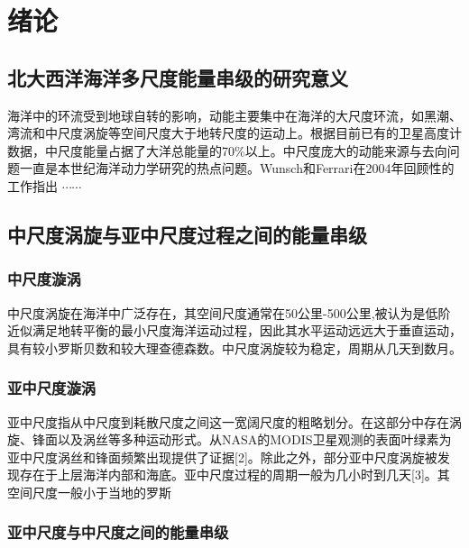 \chapter{绪论}


\section{北大西洋海洋多尺度能量串级的研究意义}

海洋中的环流受到地球自转的影响，动能主要集中在海洋的大尺度环流，如黑潮、湾流和中尺度涡旋等空间尺度大于地转尺度的运动上。根据目前已有的卫星高度计数据，中尺度能量占据了大洋总能量的70\%以上。中尺度庞大的动能来源与去向问题一直是本世纪海洋动力学研究的热点问题。Wunsch和Ferrari在2004年回顾性的工作指出 $\cdots\cdots$ 


\section{中尺度涡旋与亚中尺度过程之间的能量串级}

\subsection{中尺度漩涡}

中尺度涡旋在海洋中广泛存在，其空间尺度通常在50公里-500公里,被认为是低阶近似满足地转平衡的最小尺度海洋运动过程，因此其水平运动远远大于垂直运动，具有较小罗斯贝数和较大理查德森数。中尺度涡旋较为稳定，周期从几天到数月。

\subsection{亚中尺度漩涡}

亚中尺度指从中尺度到耗散尺度之间这一宽阔尺度的粗略划分。在这部分中存在涡旋、锋面以及涡丝等多种运动形式。从NASA的MODIS卫星观测的表面叶绿素为亚中尺度涡丝和锋面频繁出现提供了证据[2]。除此之外，部分亚中尺度涡旋被发现存在于上层海洋内部和海底。亚中尺度过程的周期一般为几小时到几天[3]。其空间尺度一般小于当地的罗斯

\subsection{亚中尺度与中尺度之间的能量串级}


